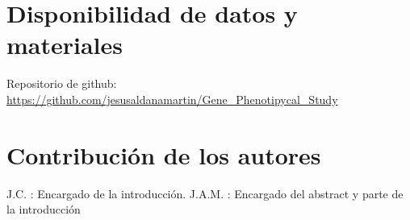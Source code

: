 \documentclass{bmcart}
\begin{document}
	\begin{backmatter}
	
		
		\section*{Disponibilidad de datos y materiales}%
			Repositorio de github:
			\href{https://github.com/jesusaldanamartin/Gene_Phenotipycal_Study}{https://github.com/jesusaldanamartin/Gene\_Phenotipycal\_Study}
		
		\section*{Contribución de los autores}
			J.C. : Encargado de la introducción. 
			J.A.M. : Encargado del abstract y parte de la introducción
		
		
		
	
	\end{backmatter}
\end{document}
